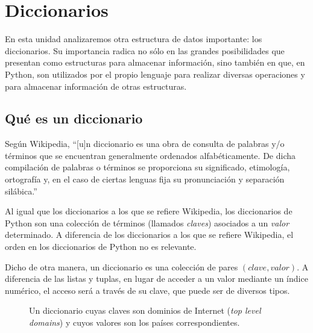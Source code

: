 \chapter{Diccionarios}

En esta unidad analizaremos otra estructura de datos importante: los diccionarios.
Su importancia radica no sólo en las grandes posibilidades que presentan
como estructuras para almacenar información, sino también en que, en
Python, son utilizados por el propio lenguaje para realizar diversas
operaciones y para almacenar información de otras estructuras.

\section{Qué es un diccionario}

Según Wikipedia, ``[u]n diccionario es una obra de consulta de
palabras y/o términos que se encuentran generalmente ordenados
alfabéticamente. De dicha compilación de palabras o términos se
proporciona su significado, etimología, ortografía y, en el caso
de ciertas lenguas fija su pronunciación y separación silábica.''


Al igual que los diccionarios a los que se refiere Wikipedia,
los diccionarios de Python son una colección de términos (llamados
\emph{claves}) asociados a un \emph{valor} determinado. A diferencia de los
diccionarios a los que se refiere Wikipedia, el orden en los diccionarios de
Python no es relevante.

Dicho de otra manera, un diccionario es una colección de pares $(clave,
valor)$. A diferencia de las listas y tuplas, en lugar de acceder a un valor
mediante un índice numérico, el acceso será a través de su clave, que puede
ser de diversos tipos.

\begin{figure}[hbt]
\caption{Un diccionario cuyas claves son dominios de Internet (\emph{top level
    domains}) y cuyos valores son los países correspondientes.}
\end{figure}


